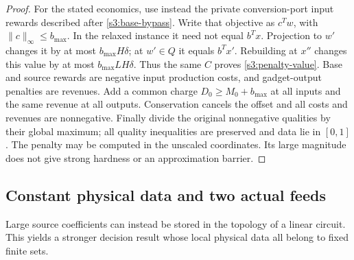 \begin{proof}
For the stated economics, use instead the private conversion-port input
rewards described after \cref{s3:base-bypass}. Write that objective as
$c^Tw$, with $\|c\|_\infty\le b_{\max}$. In the relaxed instance it
need not equal $b^Tx$. Projection to $w'$ changes it by at most
$b_{\max}H\delta$; at $w'\in Q$ it equals $b^Tx'$. Rebuilding at
$x''$ changes this value by at most $b_{\max}LH\delta$. Thus the
same $C$ proves \eqref{s3:penalty-value}. Base and source rewards are
negative input production costs, and gadget-output penalties are
revenues. Add a common charge $D_0\ge M_0+b_{\max}$ at all inputs
and the same revenue at all outputs. Conservation cancels the offset
and all costs and revenues are nonnegative. Finally divide the original
nonnegative qualities by their global maximum; all quality inequalities
are preserved and data lie in $[0,1]$. The penalty may be computed in
the unscaled coordinates. Its large magnitude does not give strong
hardness or an approximation barrier.
\end{proof}

\subsection{Constant physical data and two actual feeds}\label{s3:constant-data}

Large source coefficients can instead be stored in the topology of a
linear circuit. This yields a stronger decision result whose local
physical data all belong to fixed finite sets.

